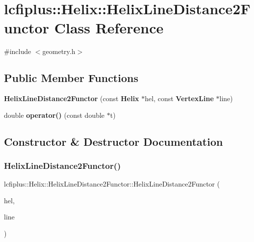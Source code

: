 \section{lcfiplus\+:\+:Helix\+:\+:Helix\+Line\+Distance2\+Functor Class Reference}
\label{classlcfiplus_1_1Helix_1_1HelixLineDistance2Functor}


{\ttfamily \#include $<$geometry.\+h$>$}

\subsection*{Public Member Functions}
\begin{DoxyCompactItemize}
\item 
\textbf{ Helix\+Line\+Distance2\+Functor} (const \textbf{ Helix} $\ast$hel, const \textbf{ Vertex\+Line} $\ast$line)
\item 
double \textbf{ operator()} (const double $\ast$t)
\end{DoxyCompactItemize}


\subsection{Constructor \& Destructor Documentation}
\mbox{\label{classlcfiplus_1_1Helix_1_1HelixLineDistance2Functor_a8c9072f80cd97be25fde6eaf709fd47e}} 
\subsubsection{Helix\+Line\+Distance2\+Functor()}
{\footnotesize\ttfamily lcfiplus\+::\+Helix\+::\+Helix\+Line\+Distance2\+Functor\+::\+Helix\+Line\+Distance2\+Functor (\begin{DoxyParamCaption}\item[{const \textbf{ Helix} $\ast$}]{hel,  }\item[{const \textbf{ Vertex\+Line} $\ast$}]{line }\end{DoxyParamCaption})\hspace{0.3cm}{\ttfamily [inline]}}



